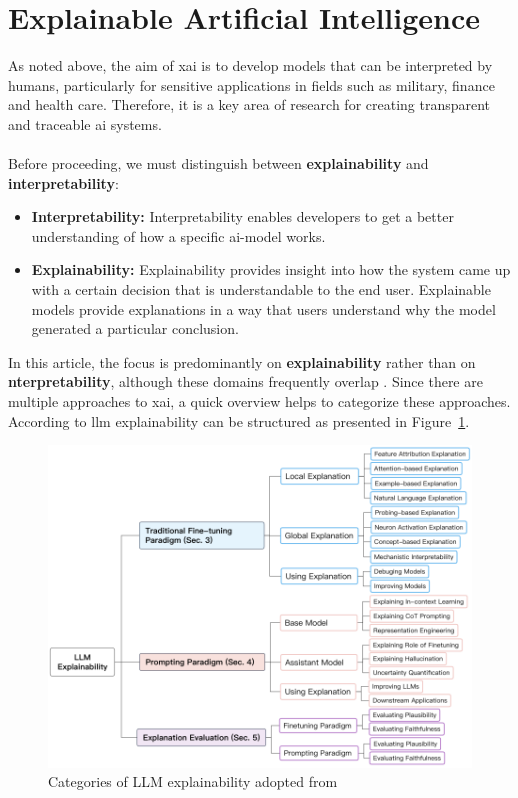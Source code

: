 \section{Explainable Artificial Intelligence} \label{sec:xai}
As noted above, the aim of \acrshort{xai} is to develop models that can be interpreted by humans, particularly for sensitive applications in fields such as military, finance and health care. Therefore, it is a key area of research for creating transparent and traceable \acrshort{ai} systems.
\\\\
Before proceeding, we must distinguish between \textbf{explainability} and \textbf{interpretability}:
\begin{itemize}
    \item \textbf{Interpretability:} Interpretability enables developers to get a better understanding of how a specific \acrshort{ai}-model works.
    \item \textbf{Explainability:} Explainability provides insight into how the system came up with a certain decision that is understandable to the end user. Explainable models provide explanations in a way that users understand why the model generated a particular conclusion.
\end{itemize}
In this article, the focus is predominantly on \textbf{explainability} rather than on \textbf{nterpretability}, although these domains frequently overlap \cite{ALI2023101805}. Since there are multiple approaches to \acrshort{xai}, a quick overview helps to categorize these approaches. According to \cite{zhao2023explainabilitylargelanguagemodels} \acrshort{llm} explainability can be structured as presented in Figure~\ref{fig:llm_explainability}.
\begin{figure}[ht]
    \centering
    \includegraphics[width=1\textwidth]{figures/llm_explainability.png}
    \caption{Categories of LLM explainability adopted from \cite{zhao2023explainabilitylargelanguagemodels}} 
    \label{fig:llm_explainability}
\end{figure}
